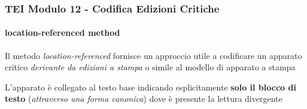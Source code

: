 \begin{frame}
    \frametitle{TEI Modulo 12 - Codifica Edizioni Critiche}
    \framesubtitle{location-referenced method}
    \addtocounter{nframe}{1}
    




    \begin{block}
        Il metodo \textit{location-referenced} fornisce un approccio utile a codificare un apparato critico \textit{derivante da edizioni a stampa} o simile al modello di apparato a stampa
    \end{block}
    \begin{block}
         L'apparato è collegato al testo base indicando esplicitamente \textbf{solo il blocco di testo} (\textit{attraverso una forma canonica}) dove è presente la lettura divergente
     \end{block}

\end{frame}



